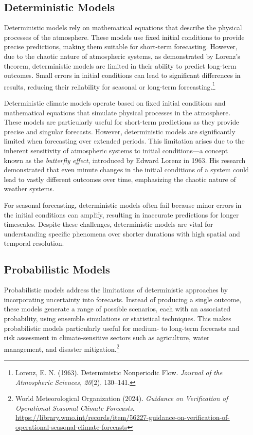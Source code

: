 \subsection{Deterministic Models}
Deterministic models rely on mathematical equations that describe the physical processes of the atmosphere. These models use fixed initial conditions to provide precise predictions, making them suitable for short-term forecasting. However, due to the chaotic nature of atmospheric systems, as demonstrated by Lorenz's theorem, deterministic models are limited in their ability to predict long-term outcomes. Small errors in initial conditions can lead to significant differences in results, reducing their reliability for seasonal or long-term forecasting.\footnote{Lorenz, E. N. (1963). Deterministic Nonperiodic 
Flow. \textit{Journal of the Atmospheric Sciences, 20}(2), 130–141.}

Deterministic climate models operate based on fixed initial conditions and mathematical equations that simulate physical processes in the atmosphere. These models are particularly useful for short-term predictions as they provide precise and singular forecasts. However, deterministic models are significantly limited when forecasting over extended periods. This limitation arises due to the inherent sensitivity of atmospheric systems to initial conditions—a concept known as the \textit{butterfly effect}, introduced by Edward Lorenz in 1963. His research demonstrated that even minute changes in the initial conditions of a system could lead to vastly different outcomes over time, emphasizing the chaotic nature of weather systems.

For seasonal forecasting, deterministic models often fail because minor errors in the initial conditions can amplify, resulting in inaccurate predictions for longer timescales. Despite these challenges, deterministic models are vital for understanding specific phenomena over shorter durations with high spatial and temporal resolution.




\subsection{Probabilistic Models}
Probabilistic models address the limitations of deterministic approaches by incorporating uncertainty into forecasts. Instead of producing a single outcome, these models generate a range of possible scenarios, each with an associated probability, using ensemble simulations or statistical techniques. This makes probabilistic models particularly useful for medium- to long-term forecasts and risk assessment in climate-sensitive sectors such as agriculture, water management, and disaster mitigation.\footnote{World Meteorological Organization (2024). \textit{Guidance on Verification of Operational Seasonal Climate Forecasts}. \url{https://library.wmo.int/records/item/56227-guidance-on-verification-of-operational-seasonal-climate-forecasts}}

